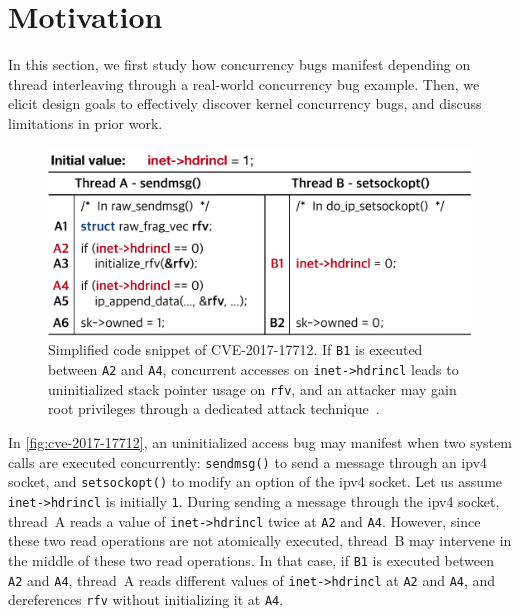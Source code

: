 \section{Motivation}
\label{s:motivation}


%
In this section, we first study how concurrency bugs manifest
depending on thread interleaving through a real-world concurrency bug
example.  Then, we elicit design goals to effectively discover kernel
concurrency bugs, and discuss limitations in prior work. 

%

%
\begin{figure}[t]
  \centering
  \includegraphics[width=0.85\linewidth]{fig/cve-2017-10661.pdf}
  \caption{Simplified code snippet of CVE-2017-17712. If \texttt{B1}
    is executed between \texttt{A2} and \texttt{A4}, concurrent
    accesses on \texttt{inet->hdrincl} leads to uninitialized stack
    pointer usage on \texttt{rfv}, and an attacker may gain root
    privileges through a dedicated attack
    technique~\cite{stackspray}.}
  \label{fig:cve-2017-17712}
  \vspace{-8pt}
\end{figure}
%
In \autoref{fig:cve-2017-17712}, an uninitialized access bug may
manifest when two system calls are executed concurrently:
\texttt{sendmsg()} to send a message through an ipv4 socket, and
\texttt{setsockopt()} to modify an option of the ipv4 socket.
Let us assume \texttt{inet->hdrincl} is initially \texttt{1}.
%
During sending a message through the ipv4 socket, thread~A reads a
value of \texttt{inet->hdrincl} twice at \texttt{A2} and \texttt{A4}.
%
However, since these two read operations are not atomically executed,
thread~B may intervene in the middle of these two read operations.
%
In that case, if \texttt{B1} is executed between \texttt{A2} and
\texttt{A4}, thread~A reads different values of \texttt{inet->hdrincl}
at \texttt{A2} and \texttt{A4}, and dereferences \texttt{rfv} without
initializing it at \texttt{A4}.


